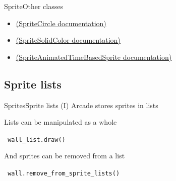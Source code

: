 \documentclass[10pt,compress]{beamer} %
\begin{document}
\begin{frame}[fragile]{Sprite}{Other classes}
	\begin{itemize}
		\item \href{https://api.arcade.academy/en/2.6.17/api/sprites.html\#arcade-spritecircle}{(SpriteCircle documentation)}
		\item \href{https://api.arcade.academy/en/2.6.17/api/sprites.html\#arcade-spritesolidcolor}{(SpriteSolidColor documentation)}
		\item \href{https://api.arcade.academy/en/2.6.17/api/sprites.html\#arcade-animatedtimebasedsprite}{(SpriteAnimatedTimeBasedSprite documentation)}
	\end{itemize}
\end{frame}

\subsection{Sprite lists}

\begin{frame}{Sprites}{Sprite lists (I)}
	Arcade stores sprites in lists
    
	\begin{exampleblock}{}
	
	\end{exampleblock}

       Lists can be manipulated as a whole

	\begin{exampleblock}{}
        \texttt{
        wall\_list.draw()
        }
	\end{exampleblock}

    	And sprites can be removed from a list
	\begin{exampleblock}{}
        \texttt{
        wall.remove\_from\_sprite\_lists()
        }
	\end{exampleblock}
\end{frame}
\end{document}
